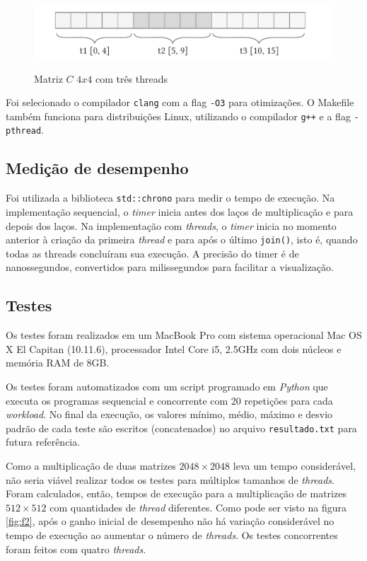 \documentclass[12pt, a4paper]{article}
\newcommand{\code}[1]{{\lstinline{#1}}}
\begin{document}
\begin{figure}[h]
\centering
\includegraphics[width=.7\textwidth]{diagram_1}
\label{fig:f1}
\caption{Matriz $ C $ $ 4x4 $ com três threads}
\end{figure}

Foi selecionado o compilador \code{clang} com a flag \code{-O3} para
otimizações. O Makefile também funciona para distribuições Linux, utilizando o
compilador \code{g++} e a flag \code{-pthread}.

\subsection{Medição de desempenho}
Foi utilizada a biblioteca \code{std::chrono} para medir o tempo de execução.
Na implementação sequencial, o \emph{timer} inicia antes dos laços de
multiplicação e para depois dos laços. Na implementação com \emph{threads}, o
\emph{timer} inicia no momento anterior à criação da primeira \emph{thread} e
para após o último \code{join()}, isto é, quando todas as threads concluíram
sua execução. A precisão do timer é de nanossegundos, convertidos para
milissegundos para facilitar a visualização.

\subsection{Testes}
Os testes foram realizados em um MacBook Pro com sistema operacional Mac OS X El
Capitan (10.11.6), processador Intel Core i5, 2.5GHz com dois núcleos e memória
RAM de 8GB.

Os testes foram automatizados com um script programado em \emph{Python} que
executa os programas sequencial e concorrente com 20 repetições para cada
\emph{workload}. No final da execução, os valores mínimo, médio, máximo e
desvio padrão de cada teste são escritos (concatenados) no arquivo
\code{resultado.txt} para futura referência.

Como a multiplicação de duas matrizes $ 2048 \times 2048 $ leva um tempo
considerável, não seria viável realizar todos os testes para múltiplos tamanhos
de \emph{threads}. Foram calculados, então, tempos de execução para a
multiplicação de matrizes $ 512 \times 512 $ com quantidades de \emph{thread}
diferentes. Como pode ser visto na figura \ref{fig:f2}, após o ganho inicial de
desempenho não há variação considerável no tempo de execução ao aumentar o
número de \emph{threads}. Os testes concorrentes foram feitos com quatro \emph{threads}.
\end{document}
